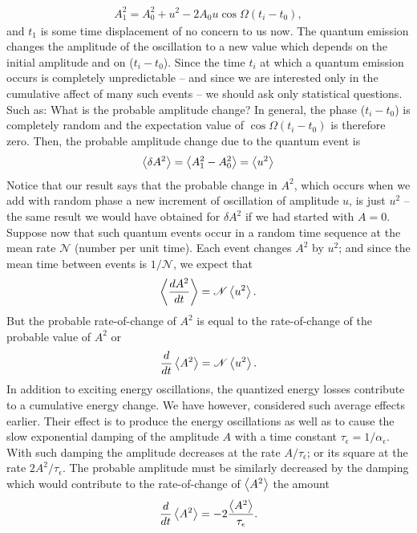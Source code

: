 \begin{align}
	A_1^2 = A_0^2 + u^2 - 2 A_0 u \cos \Omega (t_i - t_0),
\end{align}
and $t_1$ is some time displacement of no concern to us now. The quantum emission changes the amplitude of the oscillation to a new value which depends on the initial amplitude and on ($t_i - t_0$). Since the time $t_i$ at which a quantum emission occurs is completely unpredictable -- and since we are interested only in the cumulative affect of many such events -- we should ask only statistical questions. Such as: What is the probable amplitude change? In general, the phase ($t_i - t_0$) is completely random and the expectation value of $\cos\Omega(t_i - t_0)$ is therefore zero. Then, the probable amplitude change due to the quantum event is
\begin{align}\label{eq:5.25}
	\left< \delta A^2 \right> = \left< A_1^2 - A_0^2 \right> = \left< u^2 \right>
\end{align}
Notice that our result says that the probable change in $A^2$, which occurs when we add with random phase a new increment of oscillation of amplitude $u$, is just $u^2$ -- the same result we would have obtained for $\delta A^2$ if we had started with $A = 0$.\\
Suppose now that such quantum events occur in a random time sequence at the mean rate $\mathscr{N}$ (number per unit time). Each event changes $A^2$ by $u^2$; and since the mean time between events is $1/\mathscr{N}$, we expect that
\begin{align}\label{eq:5.26}
	\left< \dfrac{dA^2}{dt} \right> = \mathscr{N} \left< u^2 \right>.
\end{align}
But the probable rate-of-change of $A^2$ is equal to the rate-of-change of the probable value of $A^2$ or
\begin{align} \label{eq:5.27}
	\dfrac{d}{dt}\left< A^2 \right> = \mathscr{N} \left< u^2 \right>.
\end{align}
In addition to exciting energy oscillations, the quantized energy losses contribute to a cumulative energy change. We have however, considered such average effects earlier. Their effect is to produce the energy oscillations as well as to cause the slow exponential damping of the amplitude $A$ with a time constant $\tau_\epsilon= 1/\alpha_\epsilon$. With such damping the amplitude decreases at the rate $A/\tau_\epsilon$; or its square at the rate $2A^2/\tau_\epsilon$. The probable amplitude must be similarly decreased by the damping which would contribute to the rate-of-change of $\left< A^2 \right>$ the amount
\begin{align} \label{eq:5.28}
	\dfrac{d}{dt}\left< A^2 \right> = -2 \dfrac{\left< A^2 \right>}{\tau_\epsilon}.
\end{align}
